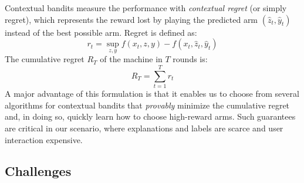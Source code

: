 \documentclass[letterpaper]{article} %
\begin{document}
Contextual bandits measure the performance with \emph{contextual regret} (or simply regret), which represents the reward lost by playing the predicted arm $(\hat{z}_t, \hat{y}_t)$ instead of the best possible arm. Regret is defined as:
%
\[
    \textstyle
    r_t = \sup_{z, y} f(x_t, z, y) - f(x_t, \hat{z}_t, \hat{y}_t)
    \label{eq:reg}
\]
%
The cumulative regret $R_T$ of the machine in $T$ rounds is:
%
\[
    \textstyle
    R_T = \sum_{t = 1}^T r_t
    \label{eq:cumreg}
\]
%
A major advantage of this formulation is that it enables us to choose from several algorithms for contextual bandits that \emph{provably} minimize the cumulative regret and, in doing so, quickly learn how to choose high-reward arms.  Such guarantees are critical in our scenario, where explanations and labels are scarce and user interaction expensive.


\subsection{Challenges}
\end{document}
